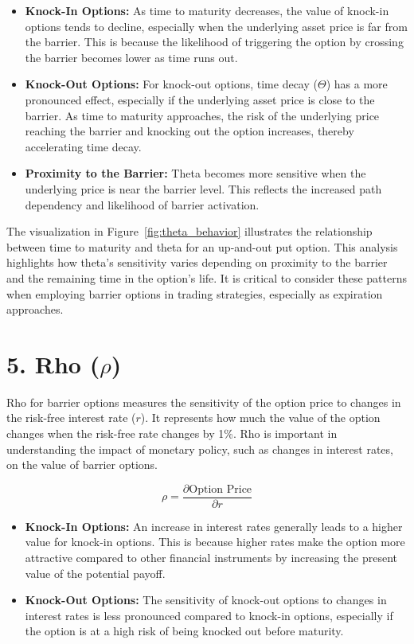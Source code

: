 \begin{itemize}
    \item \textbf{Knock-In Options:} As time to maturity decreases, the value of knock-in options tends to decline, especially when the underlying asset price is far from the barrier. This is because the likelihood of triggering the option by crossing the barrier becomes lower as time runs out.
    
    \item \textbf{Knock-Out Options:} For knock-out options, time decay (\(\Theta\)) has a more pronounced effect, especially if the underlying asset price is close to the barrier. As time to maturity approaches, the risk of the underlying price reaching the barrier and knocking out the option increases, thereby accelerating time decay.
    
    \item \textbf{Proximity to the Barrier:} Theta becomes more sensitive when the underlying price is near the barrier level. This reflects the increased path dependency and likelihood of barrier activation.
\end{itemize}

The visualization in Figure~\ref{fig:theta_behavior} illustrates the relationship between time to maturity and theta for an up-and-out put option. This analysis highlights how theta's sensitivity varies depending on proximity to the barrier and the remaining time in the option's life. It is critical to consider these patterns when employing barrier options in trading strategies, especially as expiration approaches.


\section*{5. Rho (\(\rho\))}

Rho for barrier options measures the sensitivity of the option price to changes in the risk-free interest rate (\(r\)). It represents how much the value of the option changes when the risk-free rate changes by 1\%. Rho is important in understanding the impact of monetary policy, such as changes in interest rates, on the value of barrier options.

\[
\rho = \frac{\partial \text{Option Price}}{\partial r}
\]

\begin{itemize}
    \item \textbf{Knock-In Options:} An increase in interest rates generally leads to a higher value for knock-in options. This is because higher rates make the option more attractive compared to other financial instruments by increasing the present value of the potential payoff.
    \item \textbf{Knock-Out Options:} The sensitivity of knock-out options to changes in interest rates is less pronounced compared to knock-in options, especially if the option is at a high risk of being knocked out before maturity.
\end{itemize}

